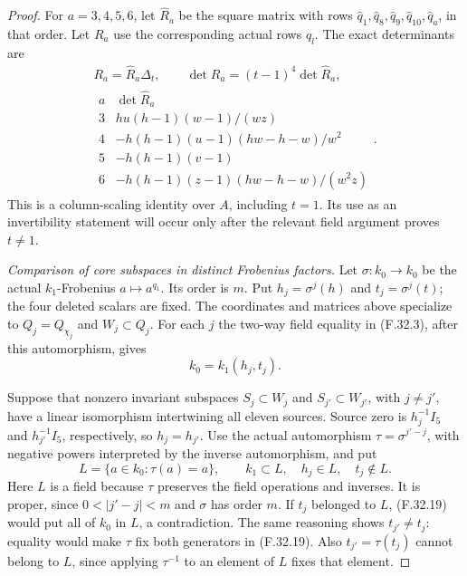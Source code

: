 \begin{proof}
For $a=3,4,5,6$, let $\widehat R_a$
be the square matrix with rows
$\widehat q_1,\widehat q_8,\widehat q_9,
\widehat q_{10},\widehat q_a$, in that order.
Let $R_a$ use the corresponding actual
rows $q_l$. The exact determinants are
\[
 \begin{gathered}
 R_a=\widehat R_a\Delta_t,\qquad
                 \det R_a=(t-1)^4\det\widehat R_a,\\
 \begin{array}{c|c}
 a&\det\widehat R_a\\\hline
 3&h u(h-1)(w-1)/(wz)\\
 4&-h(h-1)(u-1)(hw-h-w)/w^2\\
 5&-h(h-1)(v-1)\\
 6&-h(h-1)(z-1)(hw-h-w)/(w^2z)
 \end{array}.
 \end{gathered}                                                \tag{F.32.18}
\]
This is a column-scaling identity
over $A$, including $t=1$.
Its use as an invertibility statement
will occur only after the relevant
field argument proves $t\ne1$.

\emph{Comparison of core subspaces in distinct Frobenius factors.}
Let $\sigma:k_0\to k_0$ be the actual
$k_1$-Frobenius $a\mapsto a^{q_1}$.
Its order is $m$. Put
$h_j=\sigma^j(h)$ and $t_j=\sigma^j(t)$;
the four deleted scalars are fixed.
The coordinates and matrices above
specialize to $Q_j=Q_{\chi_j}$ and
$W_j\subset Q_j$.
For each $j$ the two-way field equality
in (F.32.3), after this automorphism,
gives
\[
                       k_0=k_1(h_j,t_j).
                                                               \tag{F.32.19}
\]

Suppose that nonzero invariant subspaces
$S_j\subset W_j$ and $S_{j'}\subset W_{j'}$,
with $j\ne j'$, have a linear isomorphism
intertwining all eleven sources.
Source zero is $h_j^{-1}I_5$ and
$h_{j'}^{-1}I_5$, respectively, so
$h_j=h_{j'}$. Use the actual automorphism
$\tau=\sigma^{j'-j}$, with negative powers
interpreted by the inverse automorphism,
and put
\[
 L=\{a\in k_0:\tau(a)=a\},\qquad
       k_1\subset L,\quad h_j\in L,\quad
                         t_j\notin L.
                                                               \tag{F.32.20}
\]
Here $L$ is a field because $\tau$
preserves the field operations and
inverses. It is proper, since
$0<|j'-j|<m$ and $\sigma$ has order $m$.
If $t_j$ belonged to $L$, (F.32.19)
would put all of $k_0$ in $L$, a
contradiction. The same reasoning shows
$t_{j'}\ne t_j$: equality would make
$\tau$ fix both generators in (F.32.19).
Also $t_{j'}=\tau(t_j)$ cannot belong
to $L$, since applying $\tau^{-1}$ to
an element of $L$ fixes that element.


\end{proof}
